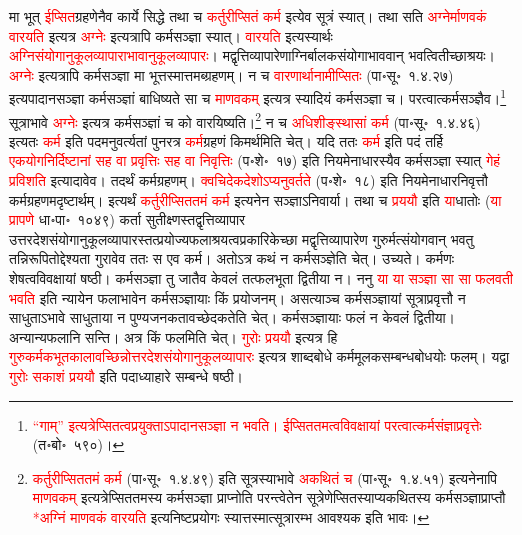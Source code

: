 \begin{sloppypar}
मा भूत् \textcolor{red}{ईप्सित}\-ग्रहणेनैव कार्ये सिद्धे तथा च \textcolor{red}{कर्तुरीप्सितं कर्म} इत्येव सूत्रं स्यात्। तथा सति \textcolor{red}{अग्नेर्माणवकं वारयति} इत्यत्र \textcolor{red}{अग्नेः} इत्यत्रापि कर्म\-सञ्ज्ञा स्यात्। \textcolor{red}{वारयति} इत्यस्यार्थः \textcolor{red}{अग्नि\-संयोगानुकूल\-व्यापाराभावानुकूल\-व्यापारः}। मद्वृत्ति\-व्यापारेणाग्निर्बालक\-संयोगाभाववान् भवत्वितीच्छाश्रयः। \textcolor{red}{अग्नेः} इत्यत्रापि कर्म\-सञ्ज्ञा मा भूत्तस्मात्तमब्ग्रहणम्।
न च \textcolor{red}{वारणार्थानामीप्सितः} (पा॰सू॰~१.४.२७) इत्यपादान\-सञ्ज्ञा कर्म\-सञ्ज्ञां बाधिष्यते सा च \textcolor{red}{माणवकम्} इत्यत्र स्यादियं कर्म\-सञ्ज्ञा च। परत्वात्कर्म\-सञ्ज्ञैव।\footnote{\textcolor{red}{“गाम्” इत्यत्रेप्सितत्व\-प्रयुक्ताऽपादानसञ्ज्ञा न भवति। ईप्सिततमत्व\-विवक्षायां परत्वात्कर्म\-संज्ञाप्रवृत्तेः} (त॰बो॰~५९०)।} सूत्राभावे \textcolor{red}{अग्नेः} इत्यत्र कर्म\-सञ्ज्ञां च को वारयिष्यति।\footnote{\textcolor{red}{कर्तुरीप्सिततमं कर्म} (पा॰सू॰~१.४.४९) इति सूत्रस्याभावे \textcolor{red}{अकथितं च} (पा॰सू॰~१.४.५१) इत्यनेनापि \textcolor{red}{माणवकम्} इत्यत्रेप्सित\-तमस्य कर्मसञ्ज्ञा प्राप्नोति परन्त्वेतेन सूत्रेणेप्सितस्याप्यकथितस्य कर्म\-सञ्ज्ञा\-प्राप्तौ \textcolor{red}{*अग्निं माणवकं वारयति} इत्यनिष्ट\-प्रयोगः स्यात्तस्मात्सूत्रारम्भ आवश्यक इति भावः।}
न च \textcolor{red}{अधि\-शीङ्\-स्थासां कर्म} (पा॰सू॰~१.४.४६) इत्यतः \textcolor{red}{कर्म} इति पदमनुवर्त्यतां पुनरत्र \textcolor{red}{कर्म}\-ग्रहणं किमर्थमिति चेत्। यदि ततः \textcolor{red}{कर्म} इति पदं तर्हि \textcolor{red}{एक\-योग\-निर्दिष्टानां सह वा प्रवृत्तिः सह वा निवृत्तिः} (प॰शे॰~१७) इति नियमेनाधारस्यैव कर्म\-सञ्ज्ञा स्यात् \textcolor{red}{गेहं प्रविशति} इत्यादावेव। तदर्थं कर्म\-ग्रहणम्। \textcolor{red}{क्वचिदेक\-देशोऽप्यनुवर्तते} (प॰शे॰~१८) इति नियमेनाधार\-निवृत्तौ कर्म\-ग्रहणमदृष्टार्थम्। इत्यर्थं \textcolor{red}{कर्तुरीप्सिततमं कर्म} इत्यनेन सञ्ज्ञाऽनिवार्या। तथा च \textcolor{red}{प्रययौ} इति \textcolor{red}{या}\-धातोः (\textcolor{red}{या प्रापणे} धा॰पा॰~१०४९) कर्ता सुतीक्ष्णस्तद्\-वृत्ति\-व्यापार उत्तर\-देश\-संयोगानुकूल\-व्यापारस्तत्प्रयोज्य\-फलाश्रयत्व\-प्रकारिकेच्छा मद्वृत्तिव्यापारेण गुरुर्मत्संयोगवान् भवतु तन्निरूपितोद्देश्यता गुरावेव ततः स एव कर्म। अतोऽत्र कथं न कर्म\-सञ्ज्ञेति चेत्। उच्यते। कर्मणः शेषत्व\-विवक्षायां षष्ठी। कर्म\-सञ्ज्ञा तु जातैव केवलं तत्फल\-भूता द्वितीया न।
ननु \textcolor{red}{या या सञ्ज्ञा सा सा फलवती भवति} इति न्यायेन फलाभावेन कर्म\-सञ्ज्ञायाः किं प्रयोजनम्।
असत्याञ्च कर्म\-सञ्ज्ञायां सूत्राप्रवृत्तौ न साधुताऽभावे साधुताया न पुण्य\-जनकतावच्छेदकतेति चेत्। कर्म\-सञ्ज्ञायाः फलं न केवलं द्वितीया। अन्यान्य\-फलानि सन्ति। अत्र किं फलमिति चेत्। \textcolor{red}{गुरोः प्रययौ} इत्यत्र हि \textcolor{red}{गुरु\-कर्मक\-भूतकालावच्छिन्नोत्तर\-देश\-संयोगानुकूल\-व्यापारः} इत्यत्र शाब्द\-बोधे कर्म\-मूलक\-सम्बन्ध\-बोधयोः फलम्। यद्वा \textcolor{red}{गुरोः सकाशं प्रययौ} इति पदाध्याहारे सम्बन्धे षष्ठी।\end{sloppypar}
